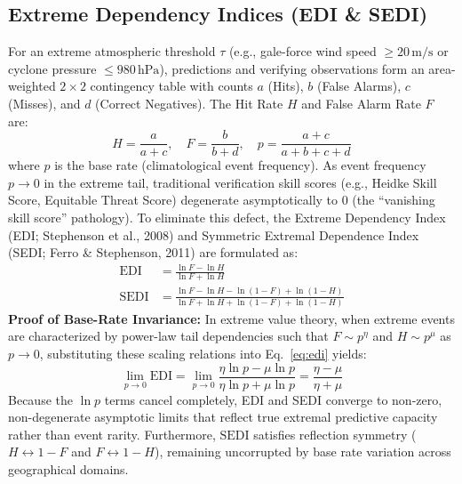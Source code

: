 \documentclass[10pt,twocolumn,letterpaper]{article}
\begin{document}
\subsection{Extreme Dependency Indices (EDI \& SEDI)}
For an extreme atmospheric threshold $\tau$ (e.g., gale-force wind speed $\ge 20\,\si{\meter\per\second}$ or cyclone pressure $\le 980\,\text{hPa}$), predictions and verifying observations form an area-weighted $2 \times 2$ contingency table with counts $a$ (Hits), $b$ (False Alarms), $c$ (Misses), and $d$ (Correct Negatives). The Hit Rate $H$ and False Alarm Rate $F$ are:
\begin{equation}
H = \frac{a}{a + c}, \quad F = \frac{b}{b + d}, \quad p = \frac{a + c}{a + b + c + d}
\end{equation}
where $p$ is the base rate (climatological event frequency). As event frequency $p \to 0$ in the extreme tail, traditional verification skill scores (e.g., Heidke Skill Score, Equitable Threat Score) degenerate asymptotically to 0 (the ``vanishing skill score'' pathology). To eliminate this defect, the Extreme Dependency Index (EDI; Stephenson et al., 2008) and Symmetric Extremal Dependence Index (SEDI; Ferro \& Stephenson, 2011) are formulated as:
\begin{align}
\mathrm{EDI} &= \frac{\ln F - \ln H}{\ln F + \ln H} \label{eq:edi} \\
\mathrm{SEDI} &= \frac{\ln F - \ln H - \ln(1 - F) + \ln(1 - H)}{\ln F + \ln H + \ln(1 - F) + \ln(1 - H)} \label{eq:sedi}
\end{align}
\textbf{Proof of Base-Rate Invariance:} In extreme value theory, when extreme events are characterized by power-law tail dependencies such that $F \sim p^\eta$ and $H \sim p^\mu$ as $p \to 0$, substituting these scaling relations into Eq.~\eqref{eq:edi} yields:
\begin{equation}
\lim_{p \to 0} \mathrm{EDI} = \lim_{p \to 0} \frac{\eta \ln p - \mu \ln p}{\eta \ln p + \mu \ln p} = \frac{\eta - \mu}{\eta + \mu}
\end{equation}
Because the $\ln p$ terms cancel completely, EDI and SEDI converge to non-zero, non-degenerate asymptotic limits that reflect true extremal predictive capacity rather than event rarity. Furthermore, $\mathrm{SEDI}$ satisfies reflection symmetry ($H \leftrightarrow 1-F$ and $F \leftrightarrow 1-H$), remaining uncorrupted by base rate variation across geographical domains.
\end{document}
